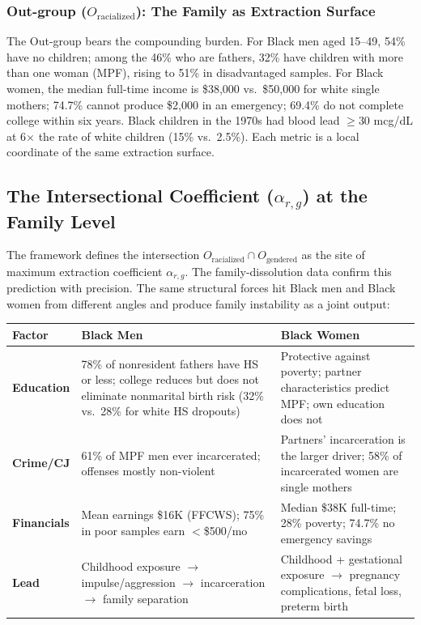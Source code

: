 \subsubsection{Out-group ($O_{\text{racialized}}$): The Family as Extraction Surface}

The Out-group bears the compounding burden. For Black men aged 15--49, 54\% have no children; among the 46\% who are fathers, 32\% have children with more than one woman (MPF), rising to 51\% in disadvantaged samples. For Black women, the median full-time income is \$38,000 vs.~\$50,000 for white single mothers; 74.7\% cannot produce \$2,000 in an emergency; 69.4\% do not complete college within six years. Black children in the 1970s had blood lead $\geq$30 mcg/dL at 6$\times$ the rate of white children (15\% vs.~2.5\%). Each metric is a local coordinate of the same extraction surface.

\subsection{The Intersectional Coefficient ($\alpha_{r,g}$) at the Family Level}

The framework defines the intersection $O_{\text{racialized}} \cap O_{\text{gendered}}$ as the site of maximum extraction coefficient $\alpha_{r,g}$. The family-dissolution data confirm this prediction with precision. The same structural forces hit Black men and Black women from different angles and produce family instability as a joint output:

\begin{center}
\small
\begin{tabular}{p{2.6cm}p{5.4cm}p{5.4cm}}
\toprule
\textbf{Factor} & \textbf{Black Men} & \textbf{Black Women} \\
\midrule
\textbf{Education} & 78\% of nonresident fathers have HS or less; college reduces but does not eliminate nonmarital birth risk (32\% vs.~28\% for white HS dropouts) & Protective against poverty; partner characteristics predict MPF; own education does not \\
\addlinespace
\textbf{Crime/CJ} & 61\% of MPF men ever incarcerated; offenses mostly non-violent & Partners' incarceration is the larger driver; 58\% of incarcerated women are single mothers \\
\addlinespace
\textbf{Financials} & Mean earnings \$16K (FFCWS); 75\% in poor samples earn $<$\$500/mo & Median \$38K full-time; 28\% poverty; 74.7\% no emergency savings \\
\addlinespace
\textbf{Lead} & Childhood exposure $\rightarrow$ impulse/aggression $\rightarrow$ incarceration $\rightarrow$ family separation & Childhood + gestational exposure $\rightarrow$ pregnancy complications, fetal loss, preterm birth \\
\bottomrule
\end{tabular}
\end{center}

